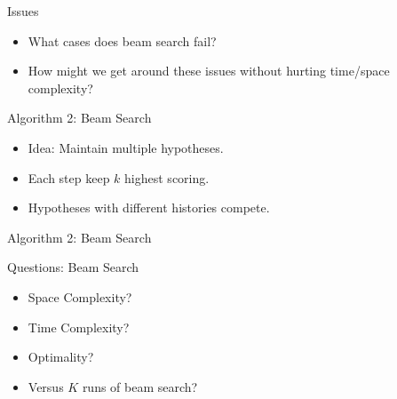 \documentclass{beamer}
\begin{document}
\begin{frame}{Issues}
  \begin{itemize}
  \item What cases does beam search fail?
    \air
  \item How might we get around these issues without hurting time/space complexity?

  \end{itemize}
\end{frame}

\begin{frame}[fragile]{Algorithm 2: Beam Search}
  \begin{itemize}
  \item Idea: Maintain multiple hypotheses.
    \air
  \item Each step keep $k$ highest scoring.
    \air 
  \item Hypotheses with different histories compete.
  \end{itemize}
\end{frame}


\begin{frame}[fragile]{Algorithm 2: Beam Search}
  
  \begin{center}
    \begin{algorithmic}
       
      \EndFor{}
      \EndFor{}
      \EndFor{}
      \EndFor{}
      \EndProcedure{}
    \end{algorithmic}
  \end{center}
\end{frame}

\begin{frame}{Questions: Beam Search}
  \begin{itemize}
  \item Space Complexity?

    \air 
  \item Time Complexity?
    \air 

  \item Optimality?
    \air 

  \item Versus $K$ runs of beam search? 
    \air 

  \end{itemize}
\end{frame}
\end{document}
